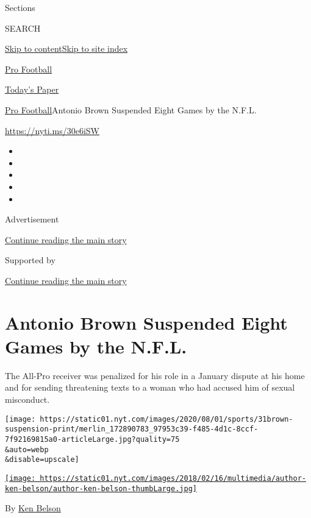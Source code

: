Sections

SEARCH

\protect\hyperlink{site-content}{Skip to
content}\protect\hyperlink{site-index}{Skip to site index}

\href{https://www.nytimes.com/section/sports/football}{Pro Football}

\href{https://myaccount.nytimes.com/auth/login?response_type=cookie\&client_id=vi}{}

\href{https://www.nytimes.com/section/todayspaper}{Today's Paper}

\href{/section/sports/football}{Pro Football}\textbar{}Antonio Brown
Suspended Eight Games by the N.F.L.

\url{https://nyti.ms/30e6iSW}

\begin{itemize}
\item
\item
\item
\item
\item
\end{itemize}

Advertisement

\protect\hyperlink{after-top}{Continue reading the main story}

Supported by

\protect\hyperlink{after-sponsor}{Continue reading the main story}

\hypertarget{antonio-brown-suspended-eight-games-by-the-nfl}{%
\section{Antonio Brown Suspended Eight Games by the
N.F.L.}\label{antonio-brown-suspended-eight-games-by-the-nfl}}

The All-Pro receiver was penalized for his role in a January dispute at
his home and for sending threatening texts to a woman who had accused
him of sexual misconduct.

\texttt{[image: https://static01.nyt.com/images/2020/08/01/sports/31brown-suspension-print/merlin\_172890783\_97953c39-f485-4d1c-8ccf-7f92169815a0-articleLarge.jpg?quality=75\\\&auto=webp\\\&disable=upscale]}

\href{https://www.nytimes.com/by/ken-belson}{\texttt{[image: https://static01.nyt.com/images/2018/02/16/multimedia/author-ken-belson/author-ken-belson-thumbLarge.jpg]}}

By \href{https://www.nytimes.com/by/ken-belson}{Ken Belson}


